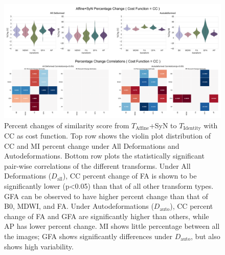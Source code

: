 \begin{figure}[H]
\includegraphics[width=\linewidth]{figure6}
\caption{
Percent changes of similarity score from \protect $T_{\text{Affine}}$+SyN to \protect $T_{\text{Identity}}$ with CC as cost function. Top row shows the violin plot distribution of CC and MI percent change under All Deformations and Autodeformations. Bottom row plots the statistically significant pair-wise correlations of the different transforms. 
Under All Deformations (\protect $D_{\text{all}}$), CC percent change of FA is shown to be significantly lower (p<0.05) than that of all other transform types. GFA can be observed to have higher percent change than that of B0, MDWI, and FA. Under Autodeformations (\protect $D_{\text{auto}}$), CC percent change of FA and GFA are significantly higher than others, while AP has lower percent change. MI shows little percentage between all the images; GFA shows significantly differences under \protect $D_{\text{auto}}$, but also shows high variability.}
\centering
\label{fig:APfigure6}
\end{figure}

